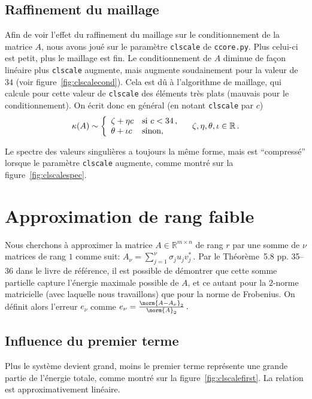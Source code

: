 \documentclass[11pt]{article}
\begin{document}
\subsection{Raffinement du maillage}
Afin de voir l'effet du raffinement du maillage sur le conditionnement de la matrice $A$, nous avons joué sur le paramètre \texttt{clscale} de \texttt{ccore.py}.
Plus celui-ci est petit, plus le maillage est fin.
Le conditionnement de $A$ diminue de façon linéaire plus \texttt{clscale} augmente, mais augmente soudainement pour la valeur de $34$ (voir figure~\ref{fig:clscalecond}).
Cela est dû à l'algorithme de maillage, qui calcule pour cette valeur de \texttt{clscale} des éléments très plats (mauvais pour le conditionnement).
On écrit donc en général (en notant \texttt{clscale} par $c$)
\[
\kappa(A) \sim \left\{ \begin{array}{ll}
\zeta + \eta c & \textnormal{si $c < 34$}\,,\\
\theta + \iota c & \textnormal{sinon,}
\end{array}\right. \quad \zeta, \eta, \theta, \iota \in \mathbb{R}\,.
\]

Le spectre des valeurs singulières a toujours la même forme,
mais est ``compressé'' lorsque le paramètre \texttt{clscale} augmente, comme montré sur la figure~\ref{fig:clscalespec}.

\section{Approximation de rang faible}
\label{approx}
Nous cherchons à approximer la matrice $A \in \mathbb{R}^{m \times n}$ de rang $r$ par une somme de $\nu$ matrices de rang $1$ comme suit:
\(
A_{\nu} = \sum_{j=1}^{\nu} \sigma_{j} u_{j} v^*_{j}\,. 
\) 
Par le Théorème~5.8 pp. 35--36 dans le livre de référence,
il est possible de démontrer que cette somme partielle
capture l'énergie maximale possible de $A$,
et ce autant pour la $2$-norme matricielle (avec laquelle nous travaillons)
que pour la norme de Frobenius.
On définit alors l'erreur $e_{\nu}$ comme
\(
e_{\nu} = \frac{\norm{A - A_{\nu}}_2}{\norm{A}_2}\,.
\)

\subsection{Influence du premier terme}
Plus le système devient grand, moins le premier terme représente une grande partie de l'énergie totale, comme montré sur la figure~\ref{fig:clscalefirst}.
La relation est approximativement linéaire.
\end{document}
